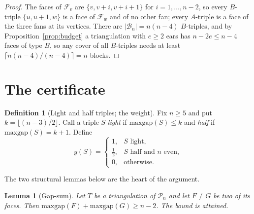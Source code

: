 \documentclass[11pt,a4paper]{article}
\newtheorem{lemma}[theorem]{Lemma}
\theoremstyle{definition}
\newtheorem{definition}[theorem]{Definition}
\newcommand{\Pol}{\mathcal{P}}
\newcommand{\maxgap}{\mathrm{maxgap}}
\begin{document}
\begin{proof}
The faces of $\mathcal{F}_v$ are $\{v, v+i, v+i+1\}$ for $i = 1, \dots, n-2$, so
every $B$-triple $\{u, u+1, w\}$ is a face of $\mathcal{F}_w$ and of no other
fan; every $A$-triple is a face of the three fans at its vertices. There are
$|\mathcal{B}_n| = n(n-4)$ $B$-triples, and by Proposition~\ref{prop:budget} a
triangulation with $e \ge 2$ ears has $n - 2e \le n-4$ faces of type $B$, so any
cover of all $B$-triples needs at least $\lceil n(n-4)/(n-4) \rceil = n$ blocks.
\end{proof}

\section{The certificate}\label{sec:main}

\begin{definition}[Light and half triples; the weight]\label{def:weight}
Fix $n \ge 5$ and put $k = \lfloor (n-3)/2 \rfloor$. Call a triple $S$
\emph{light} if $\maxgap(S) \le k$ and \emph{half} if $\maxgap(S) = k + 1$.
Define
\[
y(S) = \begin{cases}
  1, & S \text{ light},\\
  \tfrac12, & S \text{ half and } n \text{ even},\\
  0, & \text{otherwise}.
\end{cases}
\]
\end{definition}

The two structural lemmas below are the heart of the argument.

\begin{lemma}[Gap-sum]\label{lem:gapsum}
Let $T$ be a triangulation of $\Pol_n$ and let $F \ne G$ be two of its faces. Then
$\maxgap(F) + \maxgap(G) \ge n - 2$. The bound is attained.
\end{lemma}
\end{document}
